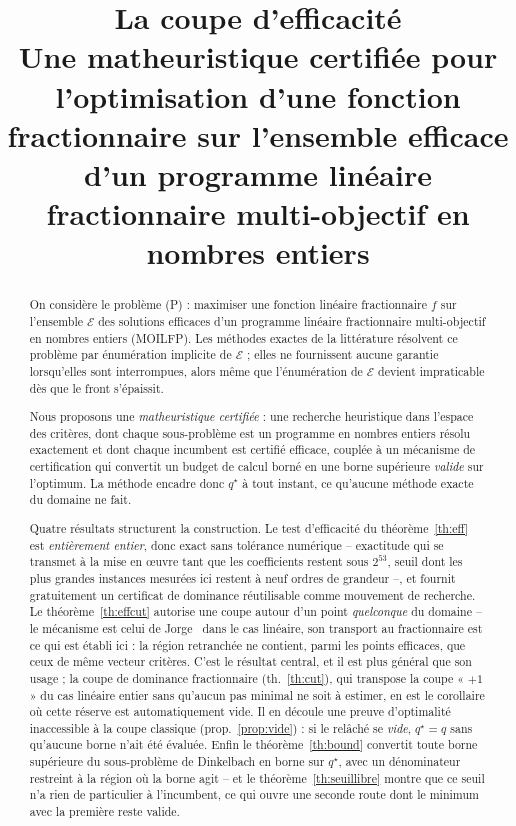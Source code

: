 \documentclass[11pt,a4paper]{article}
\title{\bfseries La coupe d'efficacité\\[2pt]
\large Une matheuristique certifiée pour l'optimisation d'une fonction
fractionnaire sur l'ensemble efficace d'un programme linéaire fractionnaire
multi-objectif en nombres entiers}
\author{}
\date{}
\theoremstyle{plain}
\theoremstyle{remark}
\newcommand{\Ecal}{\mathcal{E}}
\newcommand{\qs}{q^{\star}}
\begin{document}
\maketitle
\vspace{-2\baselineskip}

\begin{abstract}
\noindent
On considère le problème (P) : maximiser une fonction linéaire fractionnaire
$f$ sur l'ensemble $\Ecal$ des solutions efficaces d'un programme linéaire
fractionnaire multi-objectif en nombres entiers (MOILFP). Les méthodes
exactes de la littérature résolvent ce problème par énumération implicite de
$\Ecal$ ; elles ne fournissent aucune garantie lorsqu'elles sont interrompues,
alors même que l'énumération de $\Ecal$ devient impraticable dès que le front
s'épaissit.

Nous proposons une \emph{matheuristique certifiée} : une recherche
heuristique dans l'espace des critères, dont chaque sous-problème est un
programme en nombres entiers résolu exactement et dont chaque incumbent est
certifié efficace, couplée à un mécanisme de certification qui convertit un
budget de calcul borné en une borne supérieure \emph{valide} sur l'optimum.
La méthode encadre donc $\qs$ à tout instant, ce qu'aucune méthode exacte du
domaine ne fait.

Quatre résultats structurent la construction. Le test d'efficacité du
théorème~\ref{th:eff} est \emph{entièrement entier}, donc exact sans
tolérance numérique -- exactitude qui se transmet à la mise en {\oe}uvre
tant que les coefficients restent sous $2^{53}$, seuil dont les plus
grandes instances mesurées ici restent à neuf ordres de grandeur --, et
fournit gratuitement un certificat de dominance
réutilisable comme mouvement de recherche. Le théorème~\ref{th:effcut}
autorise une coupe autour d'un point \emph{quelconque} du domaine -- le
mécanisme est celui de Jorge~\cite{jorge2009} dans le cas linéaire, son
transport au fractionnaire est ce qui est établi ici : la
région retranchée ne contient, parmi les points efficaces, que ceux de même
vecteur critères. C'est le résultat central, et il est plus général que son
usage ; la coupe de dominance fractionnaire (th.~\ref{th:cut}), qui
transpose la coupe « $+1$ » du cas linéaire entier sans qu'aucun pas minimal
ne soit à estimer, en est le corollaire où cette réserve est
automatiquement vide. Il en découle une preuve d'optimalité inaccessible à
la coupe classique (prop.~\ref{prop:vide}) : si le relâché se \emph{vide},
$\qs=q$ sans qu'aucune borne n'ait été évaluée. Enfin le
théorème~\ref{th:bound} convertit toute borne supérieure du sous-problème de
Dinkelbach en borne sur $\qs$, avec un dénominateur restreint à la région où
la borne agit -- et le théorème~\ref{th:seuillibre} montre que ce seuil n'a
rien de particulier à l'incumbent, ce qui ouvre une seconde route dont le
minimum avec la première reste valide.


\end{abstract}
\end{document}
